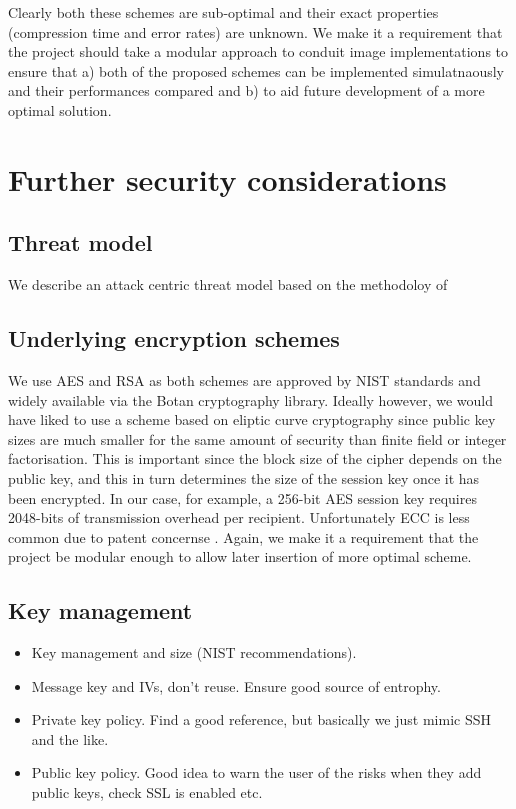 Clearly both these schemes are sub-optimal and their exact properties (compression time and error rates) are unknown. We make it a requirement that the project should take a modular approach to conduit image implementations to ensure that a) both of the proposed schemes can be implemented simulatnaously and their performances compared and b) to aid future development of a more optimal solution.



\FloatBarrier 
\section{Further security considerations}


\FloatBarrier
\subsection{Threat model}

We describe an attack centric threat model based on the methodoloy of \cite{XXX}



\FloatBarrier
\subsection{Underlying encryption schemes}

We use AES and RSA as both schemes are approved by NIST standards \cite{nist} and widely available via the Botan cryptography library. Ideally however, we would have liked to use a scheme based on eliptic curve cryptography since public key sizes are much smaller for the same amount of security than finite field or integer factorisation. This is important since the block size of the cipher depends on the public key, and this in turn determines the size of the session key once it has been encrypted. In our case, for example, a 256-bit AES session key requires 2048-bits of transmission overhead per recipient. Unfortunately ECC is less common due to patent concernse \cite{XXX}. Again, we make it a requirement that the project be modular enough to allow later insertion of more optimal scheme.


\FloatBarrier
\subsection{Key management}        
	
    
\begin{itemize}


    \item Key management and size (NIST recommendations).
    \item Message key and IVs, don't reuse. Ensure good source of entrophy.
    \item Private key policy. Find a good reference, but basically we just mimic SSH and the like.
    \item Public key policy. Good idea to warn the user of the risks when they add public keys, check SSL is enabled etc.
\end{itemize}



